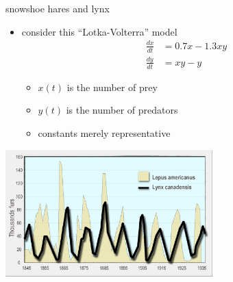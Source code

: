 \documentclass[dvipsnames,colorlinks]{beamer}
\begin{document}
\begin{frame}{snowshoe hares and lynx}

\begin{itemize}
\item consider this ``Lotka-Volterra'' model
\begin{align*}
\frac{dx}{dt} &= 0.7 x - 1.3 xy \\
\frac{dy}{dt} &= xy - y
\end{align*}

\vspace{-2mm}
    \begin{itemize}
    \item $x(t)$ is the number of prey
    \item $y(t)$ is the number of predators
    \item constants merely representative
    \end{itemize}
\end{itemize}

\bigskip
\hfill \includegraphics[width=0.6\textwidth]{figs/hares-lynx}
\end{frame}
\end{document}
